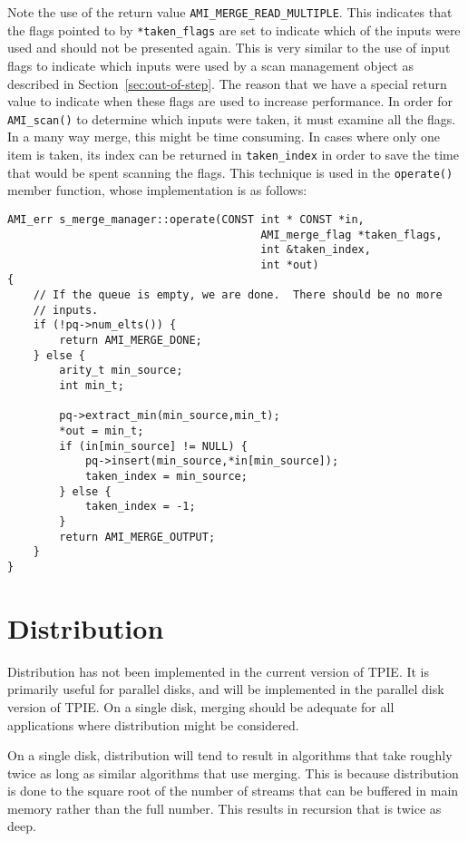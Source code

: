 Note the use of the return value \verb|AMI_MERGE_READ_MULTIPLE|.  This
indicates that the flags pointed to by \verb|*taken_flags| are set to
indicate which of the inputs were used and should not be presented
again.  This is very similar to the use of input flags to indicate
which inputs were used by a scan management object as described in
Section~\ref{sec:out-of-step}.  The reason that we have a special
return value to indicate when these flags are used to increase
performance.  In order for \verb|AMI_scan()| to determine which inputs
were taken, it must examine all the flags.  In a many way merge, this
might be time consuming.  In cases where only one item is taken, its
index can be returned in \verb|taken_index| in order to save the time
that would be spent scanning the flags.  This technique is used in the
\verb|operate()| member function, whose implementation is as follows:

\begin{verbatim}
AMI_err s_merge_manager::operate(CONST int * CONST *in,
                                       AMI_merge_flag *taken_flags,
                                       int &taken_index,
                                       int *out)
{
    // If the queue is empty, we are done.  There should be no more
    // inputs.
    if (!pq->num_elts()) {
        return AMI_MERGE_DONE;
    } else {
        arity_t min_source;
        int min_t;

        pq->extract_min(min_source,min_t);
        *out = min_t;
        if (in[min_source] != NULL) {
            pq->insert(min_source,*in[min_source]);
            taken_index = min_source;
        } else {
            taken_index = -1;
        }
        return AMI_MERGE_OUTPUT;
    }
}
\end{verbatim}

\section{Distribution} \label{sec:distribution}

Distribution has not been implemented in the current version of TPIE.
It is primarily useful for parallel disks, and will be implemented in
the parallel disk version of TPIE.  On a single disk, merging should
be adequate for all applications where distribution might be
considered.

On a single disk, distribution will tend to result in algorithms that
take roughly twice as long as similar algorithms that use merging.
This is because distribution is done to the square root of the number
of streams that can be buffered in main memory rather than the full
number.  This results in recursion that is twice as deep.

